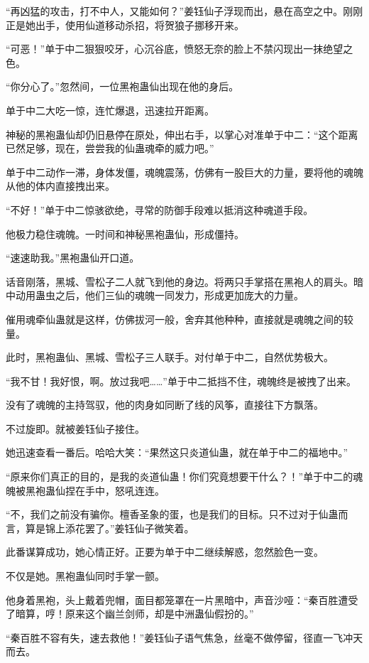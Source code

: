 \begin{this_body}
“再凶猛的攻击，打不中人，又能如何？”姜钰仙子浮现而出，悬在高空之中。刚刚正是她出手，使用仙道移动杀招，将贺狼子挪移开来。

“可恶！”单于中二狠狠咬牙，心沉谷底，愤怒无奈的脸上不禁闪现出一抹绝望之色。

“你分心了。”忽然间，一位黑袍蛊仙出现在他的身后。

单于中二大吃一惊，连忙爆退，迅速拉开距离。

神秘的黑袍蛊仙却仍旧悬停在原处，伸出右手，以掌心对准单于中二：“这个距离已然足够，现在，尝尝我的仙蛊魂牵的威力吧。”

单于中二动作一滞，身体发僵，魂魄震荡，仿佛有一股巨大的力量，要将他的魂魄从他的体内直接拽出来。

“不好！”单于中二惊骇欲绝，寻常的防御手段难以抵消这种魂道手段。

他极力稳住魂魄。一时间和神秘黑袍蛊仙，形成僵持。

“速速助我。”黑袍蛊仙开口道。

话音刚落，黑城、雪松子二人就飞到他的身边。将两只手掌搭在黑袍人的肩头。暗中动用蛊虫之后，他们三仙的魂魄一同发力，形成更加庞大的力量。

催用魂牵仙蛊就是这样，仿佛拔河一般，舍弃其他种种，直接就是魂魄之间的较量。

此时，黑袍蛊仙、黑城、雪松子三人联手。对付单于中二，自然优势极大。

“我不甘！我好恨，啊。放过我吧……”单于中二抵挡不住，魂魄终是被拽了出来。

没有了魂魄的主持驾驭，他的肉身如同断了线的风筝，直接往下方飘落。

不过旋即。就被姜钰仙子接住。

她迅速查看一番后。哈哈大笑：“果然这只炎道仙蛊，就在单于中二的福地中。”

“原来你们真正的目的，是我的炎道仙蛊！你们究竟想要干什么？！”单于中二的魂魄被黑袍蛊仙捏在手中，怒吼连连。

“不，我们之前没有骗你。檀香圣象的蛋，也是我们的目标。只不过对于仙蛊而言，算是锦上添花罢了。”姜钰仙子微笑着。

此番谋算成功，她心情正好。正要为单于中二继续解惑，忽然脸色一变。

不仅是她。黑袍蛊仙同时手掌一颤。

他身着黑袍，头上戴着兜帽，面目都笼罩在一片黑暗中，声音沙哑：“秦百胜遭受了暗算，哼！原来这个幽兰剑师，却是中洲蛊仙假扮的。”

“秦百胜不容有失，速去救他！”姜钰仙子语气焦急，丝毫不做停留，径直一飞冲天而去。


\end{this_body}
